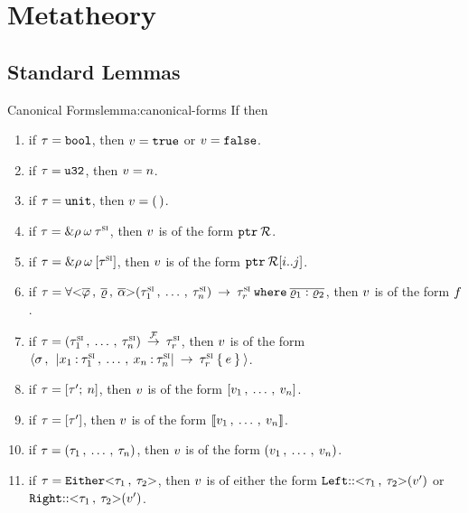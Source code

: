 \section{Metatheory}
\label{sec:metatheory-full}

\subsection{Standard Lemmas}
\label{sec:lemmas}

\begin{oxlemma}{Canonical Forms}{lemma:canonical-forms}
  If
  \oxtypjudge{\oxglobalctx}{\oxtvarctx}{\oxkontctx}{\oxvarctx}{\oxvalue}{\oxtype}{\oxvarctx}
  then

  \begin{enumerate}
  \item if $\tau = \mathtt{bool}$, then $v = \mathtt{true}$ or $v =
    \mathtt{false}$.
  \item if $\tau = \mathtt{u32}$, then $v = n$.
  \item if $\tau = \mathtt{unit}$, then $v = \mathtt{(\,)}$.
  \item if $\tau = \& \rho \: \omega \: \tau^\textsc{si}$, then $
    v$ is of the form $\mathtt{ptr} \: \mathcal{R}$.
  \item if $\tau = \& \rho \: \omega \: [\tau^\textsc{si}]$, then $
    v$ is of the form $\mathtt{ptr} \: \mathcal{R} [ i .. j ]$.
  \item if $\tau = \forall \mathtt{<} 
      \overline{\varphi} \, , \: \overline{\varrho} \, , \:
      \overline{\alpha}
     \mathtt{>} (\tau^\textsc{si}_1 \, , \: \ldots \, , \: \tau^\textsc{si}_n) \: \overset{}{\rightarrow} \: \tau^\textsc{si}_r \: \mathtt{where} \: 
      \overline{\varrho_1 : \varrho_2}
    $, then $v$ is of the form $f$.
  \item if $\tau = (
        \tau^\textsc{si}_1 \, , \: \ldots \, , \: \tau^\textsc{si}_n
      ) \: \overset{\mathcal{F}}{\rightarrow} \: \tau^\textsc{si}_r$, then $v$ is of the form
      $\langle \sigma \, , \: \: | 
        x_1 \: {:} \: \tau^\textsc{si}_1 \, , \: \ldots \, , \:
        x_n \: {:} \: \tau^\textsc{si}_n
       | \: \rightarrow \: \tau^\textsc{si}_r \: \{ \: e \: \} \: \rangle$.
  \item if $\tau = [\tau^\prime ; \: n]$, then $v$ is of
    the form $[v_1 \, , \: \ldots \, , \: v_n]$.
  \item if $\tau = [\tau^\prime]$, then $v$ is of
    the form $\llbracket v_1 \, , \: \ldots \, , \: v_n \rrbracket$.
  \item if $\tau = (\tau_1 \, , \: \ldots \, , \: \tau_n)$, then $v$
    is of the form $(v_1 \, , \: \ldots \, , \: v_n)$.
  \item if $\tau = \mathtt{Either} \mathtt{<} \tau_1 \, , \: \tau_2 \mathtt{>}$, then $v$ is of
    either the form $\mathtt{Left} \mathtt{::} \mathtt{<} \tau_1 \, , \: \tau_2 \mathtt{>}(v^\prime)$ or
    $\mathtt{Right} \mathtt{::} \mathtt{<} \tau_1 \, , \: \tau_2 \mathtt{>}(v^\prime)$.
  \end{enumerate}
\end{oxlemma}

